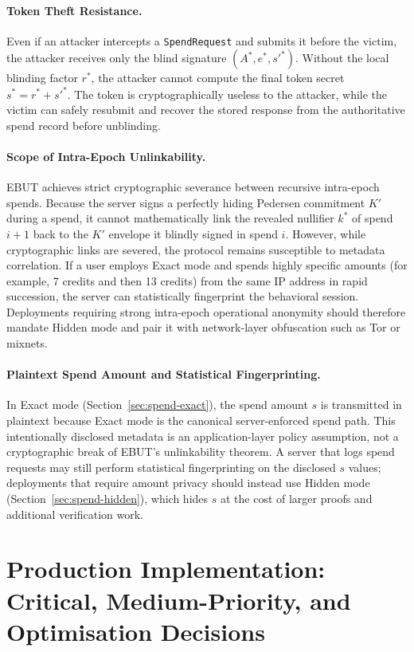 \documentclass[11pt]{article}
\theoremstyle{definitionstyle}
\theoremstyle{plain}
\begin{document}
\paragraph{Token Theft Resistance.}
Even if an attacker intercepts a \texttt{SpendRequest} and submits it before the victim, the attacker receives only the blind signature $(A^*, e^*, s'^*)$. Without the local blinding factor $r^*$, the attacker cannot compute the final token secret $s^* = r^* + s'^*$. The token is cryptographically useless to the attacker, while the victim can safely resubmit and recover the stored response from the authoritative spend record before unblinding.

\paragraph{Scope of Intra-Epoch Unlinkability.}
EBUT achieves strict cryptographic severance between recursive intra-epoch spends. Because the server signs a perfectly hiding Pedersen commitment $K'$ during a spend, it cannot mathematically link the revealed nullifier $k^*$ of spend $i+1$ back to the $K'$ envelope it blindly signed in spend $i$. However, while cryptographic links are severed, the protocol remains susceptible to metadata correlation. If a user employs Exact mode and spends highly specific amounts (for example, 7 credits and then 13 credits) from the same IP address in rapid succession, the server can statistically fingerprint the behavioral session. Deployments requiring strong intra-epoch operational anonymity should therefore mandate Hidden mode and pair it with network-layer obfuscation such as Tor or mixnets.

\paragraph{Plaintext Spend Amount and Statistical Fingerprinting.}
In Exact mode (Section~\ref{sec:spend-exact}), the spend amount $s$ is transmitted in plaintext because Exact mode is the canonical server-enforced spend path. This intentionally disclosed metadata is an application-layer policy assumption, not a cryptographic break of EBUT's unlinkability theorem. A server that logs spend requests may still perform statistical fingerprinting on the disclosed $s$ values; deployments that require amount privacy should instead use Hidden mode (Section~\ref{sec:spend-hidden}), which hides $s$ at the cost of larger proofs and additional verification work.

\section{Production Implementation: Critical, Medium-Priority, and Optimisation Decisions}
\label{sec:implementation-triage}
\label{sec:implementation}
\end{document}
